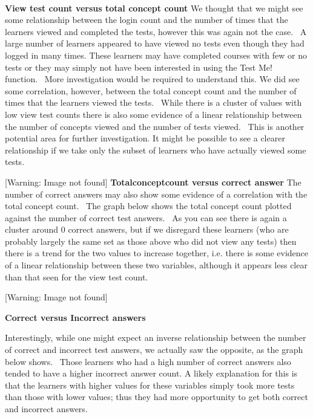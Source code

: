 \documentclass[12pt,twoside]{article}
\begin{document}
~ 

\newline
\textbf{View test count versus total concept count}\newline
We thought that we might see some relationship between the login count
and the number of times that the learners viewed and completed the
tests, however this was again not the case.~ A large number of learners
appeared to have viewed no tests even though they had logged in many
times. These learners may have completed courses with few or no tests
or they may simply not have been interested in using the
{\textquotedbl}Test Me!{\textquotedbl} function.~ More investigation
would be required to understand this.\newline
We did see some correlation, however, between the total concept count
and the number of times that the learners viewed the tests.~ While
there is a cluster of values with low view test counts there is also
some evidence of a linear relationship between the number of concepts
viewed and the number of tests viewed.~ This is another potential area
for further investigation. It might be possible to see a clearer
relationship if we take only the subset of learners who have actually
viewed some tests.

 [Warning: Image not found] \newline
\textbf{Totalconceptcount versus correct answer}\newline
The number of correct answers may also show some evidence of a
correlation with the total concept count.~ The graph below shows the
total concept count plotted against the number of correct test
answers.~ As you can see there is again a cluster around 0 correct
answers, but if we disregard these learners (who are probably largely
the same set as those above who did not view any tests) then there is a
trend for the two values to increase together, i.e. there is some
evidence of a linear relationship between these two variables, although
it appears less clear than that seen for the view test count.\newline


\bigskip

 [Warning: Image not found]  

\bigskip


\bigskip

{\bfseries
Correct versus Incorrect answers}

Interestingly, while one might expect an inverse relationship between
the number of correct and incorrect test answers, we actually saw the
opposite, as the graph below shows.~ Those learners who had a high
number of correct answers also tended to have a higher incorrect answer
count. A likely explanation for this is that the learners with higher
values for these variables simply took more tests than those with lower
values; thus they had more opportunity to get both correct and
incorrect answers.
\end{document}
